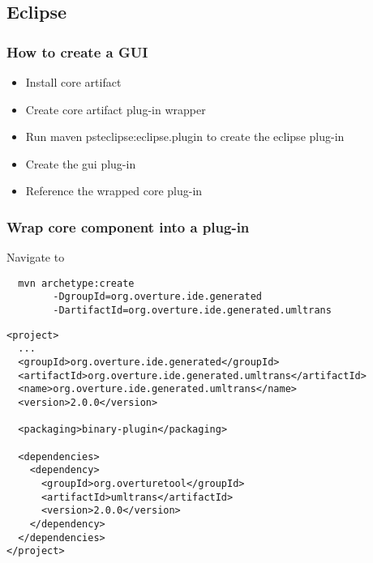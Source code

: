 \subsection{Eclipse}


\frame
{
  \frametitle{How to create a GUI}
\begin{itemize}
	\item Install core artifact
	\item Create core artifact plug-in wrapper
	\item Run maven psteclipse:eclipse.plugin to create the eclipse plug-in
	\item Create the gui plug-in
	\item Reference the wrapped core plug-in
\end{itemize}


}

\begin{frame}[fragile]
  \frametitle{Wrap core component into a plug-in}

Navigate to 
  \begin{lstlisting}
  mvn archetype:create 
		-DgroupId=org.overture.ide.generated
		-DartifactId=org.overture.ide.generated.umltrans 
  \end{lstlisting}




\begin{lstlisting}
<project>
  ...
  <groupId>org.overture.ide.generated</groupId>
  <artifactId>org.overture.ide.generated.umltrans</artifactId>
  <name>org.overture.ide.generated.umltrans</name>
  <version>2.0.0</version>

  <packaging>binary-plugin</packaging>

  <dependencies>
    <dependency>
      <groupId>org.overturetool</groupId>
      <artifactId>umltrans</artifactId>
      <version>2.0.0</version>
    </dependency>
  </dependencies>
</project>
\end{lstlisting}
\end{frame}



